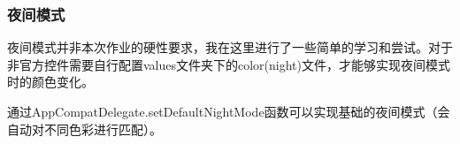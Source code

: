 \documentclass[UTF8]{article}
\begin{document}
\subsubsection{夜间模式}
夜间模式并非本次作业的硬性要求，我在这里进行了一些简单的学习和尝试。对于非官方控件需要自行配置values文件夹下的color(night)文件，才能够实现夜间模式时的颜色变化。

通过AppCompatDelegate.setDefaultNightMode函数可以实现基础的夜间模式（会自动对不同色彩进行匹配）。
\begin{figure}[htbp]
    \centering
\end{figure}
\end{document}
